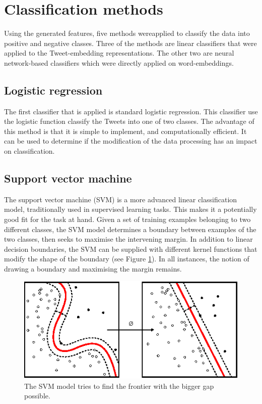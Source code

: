 \section{Classification methods}
Using the generated features, five methods wereapplied to classify the data into positive and negative classes. Three of the methods are linear classifiers that were applied to the Tweet-embedding representations. The other two are neural network-based classifiers which were directly applied on word-embeddings.

\subsection{Logistic regression}
The first classifier that is applied is standard logistic regression. This classifier use the logistic function classify the Tweets into one of two classes. The advantage of this method is that it is simple to implement, and computationally efficient. It can be used to determine if the modification of the data processing has an impact on classification.

\subsection{Support vector machine}
The support vector machine (SVM) is a more advanced linear classification model, traditionally used in supervised learning tasks. This makes it a potentially good fit for the task at hand. Given a set of training examples belonging to two different classes, the SVM model determines a boundary between examples of the two classes, then seeks to maximise the intervening margin. In addition to linear decision boundaries, the SVM can be supplied with different kernel functions that modify the shape of the boundary (see Figure \ref{plot:SVM}). In all instances, the notion of drawing a boundary and maximising the margin remains.

\begin{figure}[h!]
\centering
	\includegraphics[scale=1.2]{SVM} 
\caption{The SVM model tries to find the frontier with the bigger gap possible. \cite{wikiSVM}}
\label{plot:SVM}
\end{figure}
\FloatBarrier

